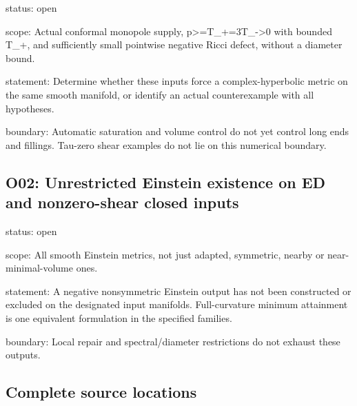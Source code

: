 \documentclass[
  10pt,
]{article}
\begin{document}
status: open

scope: Actual conformal monopole supply,
p\textgreater=T\_+=3T\_-\textgreater0 with bounded T\_+, and
sufficiently small pointwise negative Ricci defect, without a diameter
bound.

statement: Determine whether these inputs force a complex-hyperbolic
metric on the same smooth manifold, or identify an actual counterexample
with all hypotheses.

boundary: Automatic saturation and volume control do not yet control
long ends and fillings. Tau-zero shear examples do not lie on this
numerical boundary.

\hypertarget{o02-unrestricted-einstein-existence-on-ed-and-nonzero-shear-closed-inputs}{%
\subsection{O02: Unrestricted Einstein existence on ED and nonzero-shear
closed
inputs}\label{o02-unrestricted-einstein-existence-on-ed-and-nonzero-shear-closed-inputs}}

status: open

scope: All smooth Einstein metrics, not just adapted, symmetric, nearby
or near-minimal-volume ones.

statement: A negative nonsymmetric Einstein output has not been
constructed or excluded on the designated input manifolds.
Full-curvature minimum attainment is one equivalent formulation in the
specified families.

boundary: Local repair and spectral/diameter restrictions do not exhaust
these outputs.

\hypertarget{complete-source-locations}{%
\subsection{Complete source locations}\label{complete-source-locations}}
\end{document}
